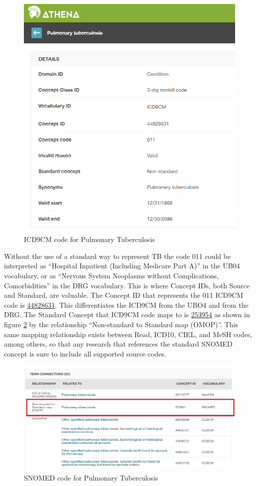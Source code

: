 \documentclass[11pt]{book}
\theoremstyle{definition}
\theoremstyle{definition}
\theoremstyle{definition}
\theoremstyle{remark}
\begin{document}
\begin{figure}

{\centering \includegraphics[width=0.75\linewidth]{images/CommonDataModel/pulmTubICD9} 

}

\caption{ICD9CM code for Pulmonary Tuberculosis}\label{fig:pulmTubICD9}
\end{figure}

Without the use of a standard way to represent TB the code 011 could be interpreted as ``Hospital Inpatient (Including Medicare Part A)'' in the UB04 vocabulary, or as ``Nervous System Neoplasms without Complications, Comorbidities'' in the DRG vocabulary. This is where Concept IDs, both Source and Standard, are valuable. The Concept ID that represents the 011 ICD9CM code is \href{http://athena.ohdsi.org/search-terms/terms/44828631}{44828631}. This differentiates the ICD9CM from the UBO4 and from the DRG. The Standard Concept that ICD9CM code maps to is \href{http://athena.ohdsi.org/search-terms/terms/253954}{253954} as shown in figure \ref{fig:pulmTubMap} by the relationship ``Non-standard to Standard map (OMOP)''. This same mapping relationship exists between Read, ICD10, CIEL, and MeSH codes, among others, so that any research that references the standard SNOMED concept is sure to include all supported source codes.

\begin{figure}
\includegraphics[width=1\linewidth]{images/CommonDataModel/pulmTubMap} \caption{SNOMED code for Pulmonary Tuberculosis}\label{fig:pulmTubMap}
\end{figure}
\end{document}
